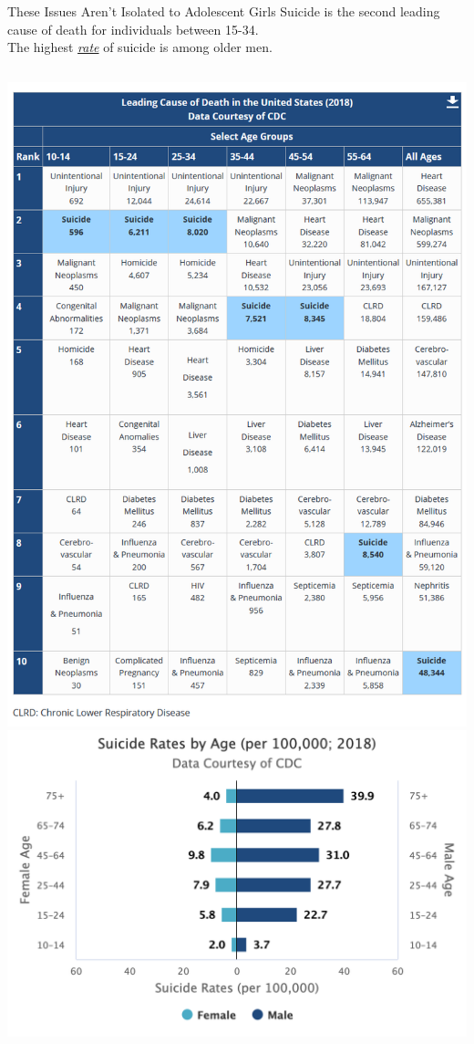 \documentclass[nobackground,dvipsnames,table,aspectratio=169]{beamer}
\begin{document}
\begin{frame}{These Issues Aren't Isolated to Adolescent Girls}
    \small
    Suicide is the second leading cause of death for individuals between 15-34.\\
    The highest \underline{\textit{rate}} of suicide is among older men.
    \begin{columns}
            \includegraphics[width=\textwidth]{leading-causes-of-death-suicide-2018}
            \includegraphics[width=\textwidth]{suicide-rates-by-age}
    \end{columns}
\end{frame}
\end{document}
